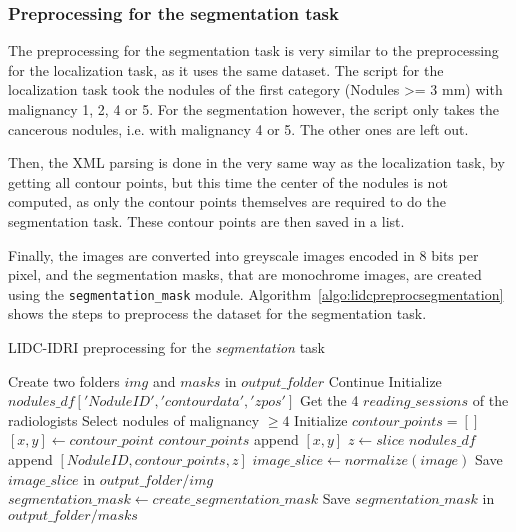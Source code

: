 \subsubsection{Preprocessing for the segmentation task}
The preprocessing for the segmentation task is very similar to the preprocessing for the localization task, as it uses the same dataset. The script for the localization task took the nodules of the first category (Nodules >= 3 mm) with malignancy 1, 2, 4 or 5. For the segmentation however, the script only takes the cancerous nodules, i.e. with malignancy 4 or 5. The other ones are left out.

Then, the XML parsing is done in the very same way as the localization task, by getting all contour points, but this time the center of the nodules is not computed, as only the contour points themselves are required to do the segmentation task. These contour points are then saved in a list.

Finally, the images are converted into greyscale images encoded in 8 bits per pixel, and the segmentation masks, that are monochrome images, are created using the \texttt{segmentation\_mask} module. Algorithm~\ref{algo:lidcpreprocsegmentation} shows the steps to preprocess the dataset for the segmentation task.

\begin{algorithm}[t!]
  \caption{LIDC-IDRI preprocessing for the \emph{segmentation} task}
  \label{algo:lidcpreprocsegmentation}
  \begin{algorithmic}[1]
    \State Create two folders $img$ and $masks$ in $output\_folder$
     
        \State Continue
      \EndIf
      \State Initialize $nodules\_df['Nodule ID', 'contour data', 'z pos']$
      \State Get the 4 $reading\_sessions$ of the radiologists 
          \State Select nodules of malignancy $\geq 4$
          \State Initialize $contour\_points = []$
              \State $[x, y] \gets contour\_point$ 
              \State $contour\_points$ append $[x, y]$
            \EndFor
            \State $z \gets slice$
            \State $nodules\_df$ append $[NoduleID, contour\_points, z]$
          \EndFor
        \EndFor
      \EndFor
            \State $image\_slice \gets normalize(image)$ 
            \State Save $image\_slice$ in $output\_folder/img$
            \State $segmentation\_mask \gets create\_segmentation\_mask$
            \State Save $segmentation\_mask$ in $output\_folder/masks$
          \EndIf
        \EndFor
      \EndFor
    \EndFor
  \end{algorithmic}
\end{algorithm}

